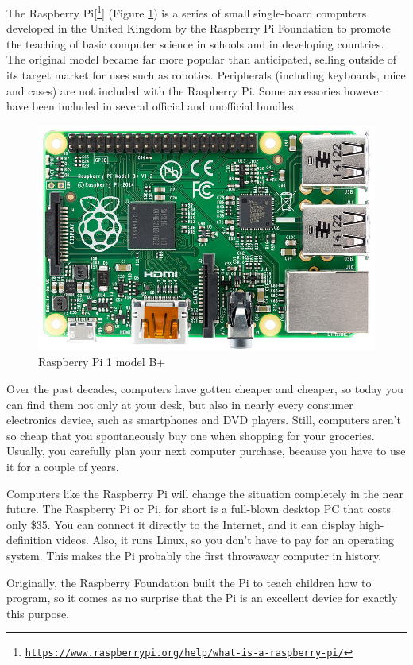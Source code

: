 The Raspberry Pi[\footnote{\href{https://www.raspberrypi.org/help/what-is-a-raspberry-pi/}{\texttt{https://www.raspberrypi.org/help/what-is-a-raspberry-pi/}}}] (Figure \ref{fig:raspberry})  is a series of small single-board computers developed in the United Kingdom by the Raspberry Pi Foundation to promote the teaching of basic computer science in schools and in developing countries. The original model became far more popular than anticipated, selling outside of its target market for uses such as robotics. Peripherals (including keyboards, mice and cases) are not included with the Raspberry Pi. Some accessories however have been included in several official and unofficial bundles.
\newline
\begin{figure}[h]
	\centering
	\includegraphics[width=0.5\linewidth]{images/raspberrypi.jpg}
	\caption{Raspberry Pi 1 model B+}
	\label{fig:raspberry}
\end{figure}

Over the past decades, computers have gotten cheaper and cheaper, so today
you can find them not only at your desk, but also in nearly every consumer
electronics device, such as smartphones and DVD players. Still, computers
aren’t so cheap that you spontaneously buy one when shopping for your
groceries. Usually, you carefully plan your next computer purchase, because
you have to use it for a couple of years.
\newline

Computers like the Raspberry Pi will change the situation completely in the
near future. The Raspberry Pi or Pi, for short is a full-blown desktop PC
that costs only \$35. You can connect it directly to the Internet, and it can
display high-definition videos. Also, it runs Linux, so you don’t have to pay
for an operating system. This makes the Pi probably the first throwaway
computer in history.
\newline

Originally, the Raspberry Foundation  built the Pi to teach children how to
program, so it comes as no surprise that the Pi is an excellent device for
exactly this purpose. 
\newline

